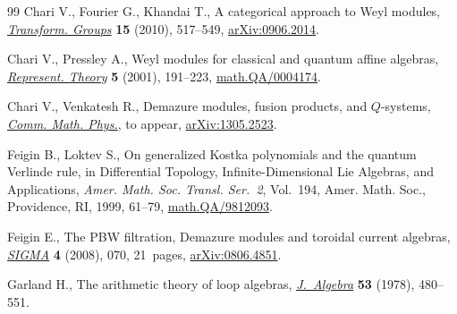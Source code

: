 \documentclass[11pt]{article}
\numberwithin{equation}{section}
\begin{document}
\begin{thebibliography}{99}
Chari V., Fourier G., Khandai T., A categorical approach to {W}eyl modules,
  \href{http://dx.doi.org/10.1007/s00031-010-9090-9}{\textit{Transform. Groups}} \textbf{15} (2010), 517--549, \href{http://arxiv.org/abs/0906.2014}{arXiv:0906.2014}.

Chari V., Pressley A., Weyl modules for classical and quantum af\/fine algebras,
  \href{http://dx.doi.org/10.1090/S1088-4165-01-00115-7}{\textit{Represent. Theory}} \textbf{5} (2001), 191--223,
  \href{http://arxiv.org/abs/math.QA/0004174}{math.QA/0004174}.

Chari V., Venkatesh R., Demazure modules, fusion products, and $Q$-systems,
  \href{http://dx.doi.org/10.1007/s00220-014-2175-x}{\textit{Comm. Math. Phys.}}, {t}o appear, \href{http://arxiv.org/abs/1305.2523}{arXiv:1305.2523}.

Feigin B., Loktev S., On generalized {K}ostka polynomials and the quantum
  {V}erlinde rule, in Dif\/ferential Topology, Inf\/inite-Dimensional {L}ie
  Algebras, and Applications, \textit{Amer. Math. Soc. Transl. Ser.~2}, Vol.~194, Amer. Math. Soc., Providence, RI, 1999, 61--79,
  \href{http://arxiv.org/abs/math.QA/9812093}{math.QA/9812093}.

Feigin E., The {PBW} f\/iltration, {D}emazure modules and toroidal current
  algebras, \href{http://dx.doi.org/10.3842/SIGMA.2008.070}{\textit{SIGMA}} \textbf{4} (2008), 070, 21~pages,
  \href{http://arxiv.org/abs/0806.4851}{arXiv:0806.4851}.

Garland H., The arithmetic theory of loop algebras, \href{http://dx.doi.org/10.1016/0021-8693(78)90294-6}{\textit{J.~Algebra}}
  \textbf{53} (1978), 480--551.

\end{thebibliography}
\end{document}
